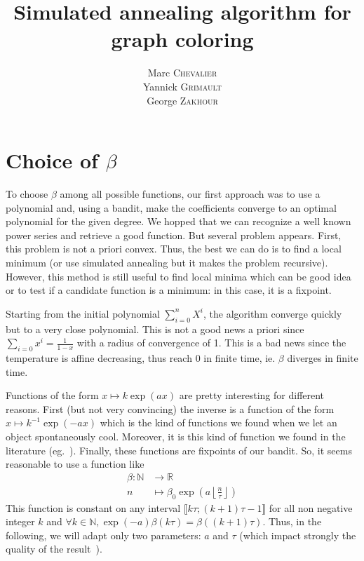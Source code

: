 \documentclass[a4paper, 11pt]{article}
\title{Simulated annealing algorithm for graph coloring}
\author{
    Marc \textsc{Chevalier}\\
    Yannick \textsc{Grimault}\\
    George \textsc{Zakhour}
}
\newcommand{\RR}{\mathbb{R}}
\newcommand{\NN}{\mathbb{N}}
\newcommand{\floor}[1]{{\left\lfloor #1 \right\rfloor}}
\begin{document}
\maketitle

\section{Choice of \texorpdfstring{$\beta$}{β}}


To choose $\beta$ among all possible functions, our first approach was to use a polynomial and, using a bandit, make the coefficients converge to an optimal polynomial for the given degree. We hopped that we can recognize a well known power series and retrieve a good function. But several problem appears. First, this problem is not a priori convex. Thus, the best we can do is to find a local minimum (or use simulated annealing but it makes the problem recursive). However, this method is still useful to find local minima which can be good idea or to test if a candidate function is a minimum: in this case, it is a fixpoint.

Starting from the initial polynomial $\sum\limits_{i=0}^n X^i$, the algorithm converge quickly but to a very close polynomial. This is not a good news a priori since $\sum\limits_{i=0} x^i = \frac{1}{1-x}$ with a radius of convergence of 1. This is a bad news since the temperature is affine decreasing, thus reach 0 in finite time, ie. $\beta$ diverges in finite time.

\bigskip

Functions of the form $x\mapsto k\exp(ax)$ are pretty interesting for different reasons. First (but not very convincing) the inverse is a function of the form $x\mapsto k^{-1}\exp(-ax)$ which is the kind of functions we found when we let an object spontaneously cool. Moreover, it is this kind of function we found in the literature (eg.~\cite{chams1987some}). Finally, these functions are fixpoints of our bandit. So, it seems reasonable to use a function like
\[
    \begin{aligned}
        \beta : \NN &\to \RR\\
        n &\mapsto \beta_0\exp\left(a\floor{\frac{n}{\tau}}\right)
    \end{aligned}
\]
This function is constant on any interval $\llbracket k\tau; (k+1)\tau -1\rrbracket$ for all non negative integer $k$ and $\forall k\in\NN, \exp(-a)\beta(k\tau) = \beta((k+1)\tau)$. Thus, in the following, we will adapt only two parameters: $a$ and $\tau$ (which impact strongly the quality of the result~\cite{chams1987some}).
\end{document}
